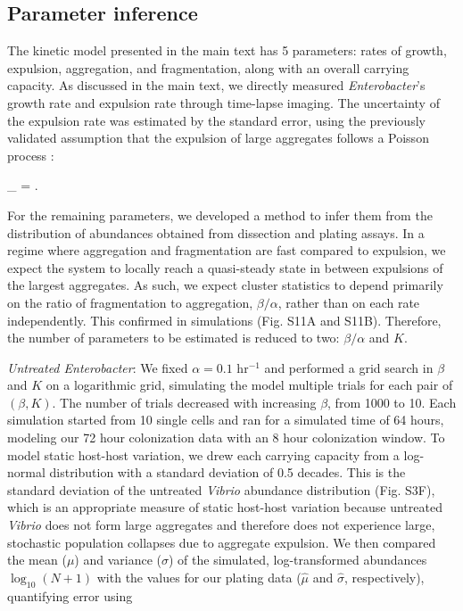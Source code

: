 \subsection*{Parameter inference}
The kinetic model presented in the main text has 5 parameters: rates of growth, expulsion, aggregation, and fragmentation, along with an overall carrying capacity. As discussed in the main text, we directly measured \textit{Enterobacter}'s growth rate and expulsion rate through time-lapse imaging. The uncertainty of the expulsion rate was estimated by the standard error, using the previously validated assumption that the expulsion of large aggregates follows a Poisson process \cite{wiles_host_2016}:

\be
{}_{\lambda} = .
\ee

For the remaining parameters, we developed a method to infer them from the distribution of abundances obtained from dissection and plating assays. In a regime where aggregation and fragmentation are fast compared to expulsion, we expect the system to locally reach a quasi-steady state in between expulsions of the largest aggregates. As such, we expect cluster statistics to depend primarily on the ratio of fragmentation to aggregation, $\beta/\alpha$, rather than on each rate independently. This confirmed in simulations (Fig. S11A and S11B). Therefore, the number of parameters to be estimated is reduced to two: $\beta/\alpha$ and $K$. 

\textit{Untreated Enterobacter}:  We fixed $\alpha = 0.1$ hr$^{-1}$ and performed a grid search in $\beta$ and $K$ on a logarithmic grid, simulating the model multiple trials for each pair of $(\beta,K)$. The number of trials decreased with increasing $\beta$, from 1000 to 10. Each simulation started from 10 single cells and ran for a simulated time of 64 hours, modeling our 72 hour colonization data with an 8 hour colonization window. To model static host-host variation, we drew each carrying capacity from a log-normal distribution with a standard deviation of 0.5 decades. This is the standard deviation of the untreated \textit{Vibrio} abundance distribution (Fig. S3F), which is an appropriate measure of static host-host variation because untreated \textit{Vibrio} does not form large aggregates and therefore does not experience large, stochastic population collapses due to aggregate expulsion. We then compared the mean ($\mu$) and variance ($\sigma$) of the simulated, log-transformed abundances $\log_{10}(N+1)$ with the values for our plating data ($\hat{\mu}$ and $\hat{\sigma}$, respectively), quantifying error using 

